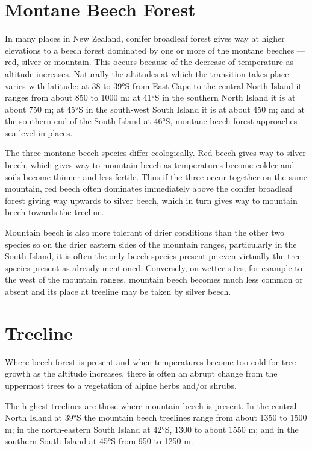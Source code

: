 \section{Montane Beech Forest}

In many places in New Zealand, conifer broadleaf forest gives way at higher elevations to a beech forest dominated by one or more of the montane beeches — red, silver or mountain.
This occurs because of the decrease of temperature as altitude increases.
Naturally the altitudes at which the transition takes place varies with latitude: at 38 to 39°S from East Cape to the central North Island it ranges from about 850 to 1000 m; at 41°S in the southern North Island it is at about 750 m; at 45°S in the south-west South Island it is at about 450 m; and at the southern end of the South Island at 46°S, montane beech forest approaches sea level in places.

The three montane beech species differ ecologically.
Red beech gives way to silver beech, which gives way to mountain beech as temperatures become colder and soils become thinner and less fertile.
Thus if the three occur together on the same mountain, red beech often dominates immediately above the conifer broadleaf forest giving way upwards to silver beech, which in turn gives way to mountain beech towards the treeline.

Mountain beech is also more tolerant of drier conditions than the other two species so on the drier eastern sides of the mountain ranges, particularly in the South Island, it is often the only beech species present pr even virtually the  tree species present as already mentioned.
Conversely, on wetter sites, for example to the west of the mountain ranges, mountain beech becomes much less common or absent and its place at treeline may be taken by silver beech.

\section{Treeline}

Where beech forest is present and when temperatures become too cold for tree growth as the altitude increases, there is often an abrupt change from the uppermost trees to a vegetation of alpine herbs and/or shrubs.

The highest treelines are those where mountain beech is present.
In the central North Island at 39°S the mountain beech treelines range from about 1350 to 1500 m; in the north-eastern South Island at 42°S, 1300 to about 1550 m; and in the southern South Island at 45°S from 950 to 1250 m.

